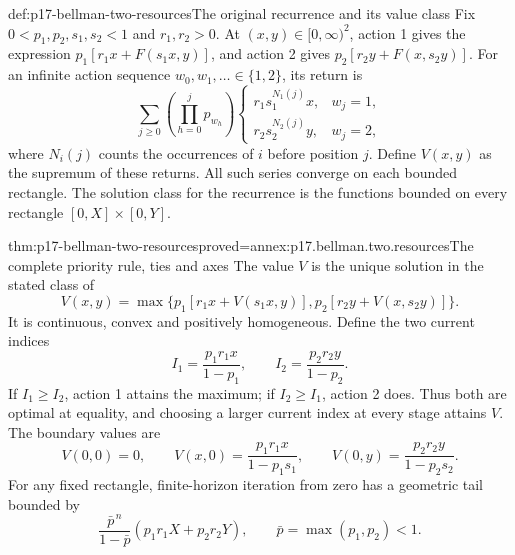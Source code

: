\begin{hbdefinition}{def:p17-bellman-two-resources}{The original recurrence and its value class}
Fix \(0<p_1,p_2,s_1,s_2<1\) and \(r_1,r_2>0\).
At \((x,y)\in[0,\infty)^2\), action 1 gives
the expression \(p_1[r_1x+F(s_1x,y)]\), and action 2
gives \(p_2[r_2y+F(x,s_2y)]\).
For an infinite action sequence \(w_0,w_1,\ldots\in\{1,2\}\),
its return is
\[
 \sum_{j\geq0}\left(\prod_{h=0}^j p_{w_h}\right)
 \begin{cases}
      r_1s_1^{N_1(j)}x,&w_j=1,\\
      r_2s_2^{N_2(j)}y,&w_j=2,
 \end{cases}
\]
where \(N_i(j)\) counts the occurrences of \(i\) before position \(j\).
Define \(V(x,y)\) as the supremum of these returns.
All such series converge on each bounded rectangle.
The solution class for the recurrence is the functions bounded
on every rectangle \([0,X]\times[0,Y]\).
\end{hbdefinition}

\begin{hbtheorem}{thm:p17-bellman-two-resources}{proved=annex:p17.bellman.two.resources}{The complete priority rule, ties and axes}
The value \(V\) is the unique solution in the stated class of
\[
           V(x,y)=\max\{p_1[r_1x+V(s_1x,y)],
                             p_2[r_2y+V(x,s_2y)]\}.
\]
It is continuous, convex and positively homogeneous.
Define the two current indices
\[
                         I_1=\frac{p_1r_1x}{1-p_1},\qquad
                         I_2=\frac{p_2r_2y}{1-p_2}.
\]
If \(I_1\geq I_2\), action 1 attains the maximum;
if \(I_2\geq I_1\), action 2 does. Thus both are optimal
at equality, and choosing a larger current index at every
stage attains \(V\).
The boundary values are
\[
     V(0,0)=0,\qquad
     V(x,0)=\frac{p_1r_1x}{1-p_1s_1},\qquad
     V(0,y)=\frac{p_2r_2y}{1-p_2s_2}.
\]
For any fixed rectangle, finite-horizon iteration from zero
has a geometric tail bounded by
\[
 \frac{\bar p^{\,n}}{1-\bar p}(p_1r_1X+p_2r_2Y),
                         \qquad \bar p=\max(p_1,p_2)<1.
\]
\end{hbtheorem}

